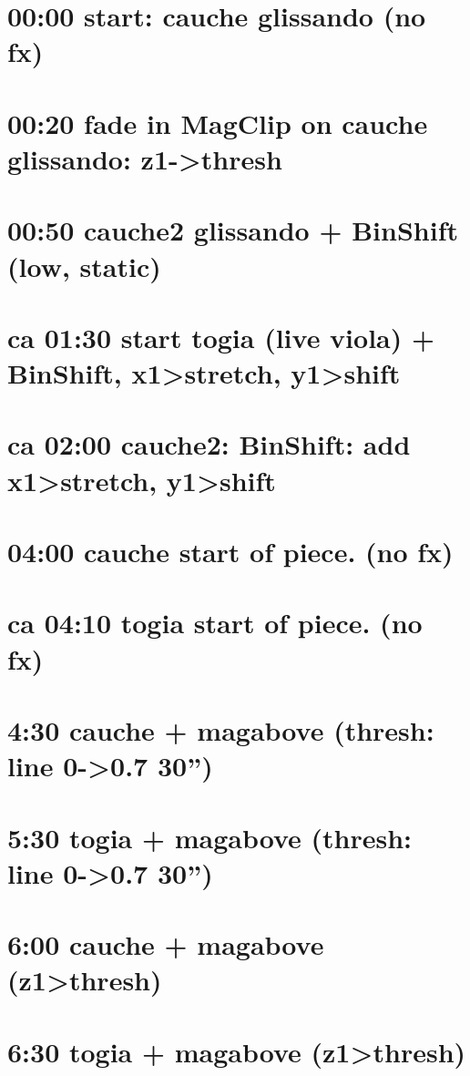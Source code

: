 \noindent
\section{00:00 start: cauche glissando (no fx)}
\label{sec:orgecc5edc}
\section{00:20 fade in MagClip on cauche glissando: z1->thresh}
\label{sec:org3e60f6a}
\section{00:50 cauche2 glissando + BinShift (low, static)}
\label{sec:org301fcdb}
\section{ca 01:30 start togia (live viola) + BinShift, x1>stretch, y1>shift}
\label{sec:org7f96b3d}
\section{ca 02:00 cauche2: BinShift: add x1>stretch, y1>shift}
\label{sec:orgb908b57}
\section{04:00 cauche start of piece. (no fx)}
\label{sec:orgd34036d}
\section{ca 04:10 togia  start of piece. (no fx)}
\label{sec:orga1cb33a}
\section{4:30 cauche + magabove (thresh: line 0->0.7 30'')}
\label{sec:org2775152}
\section{5:30 togia + magabove (thresh: line 0->0.7 30'')}
\label{sec:org2900fb0}
\section{6:00 cauche + magabove (z1>thresh)}
\label{sec:org7a20cac}
\section{6:30 togia + magabove (z1>thresh)}
\label{sec:orgb070000}
